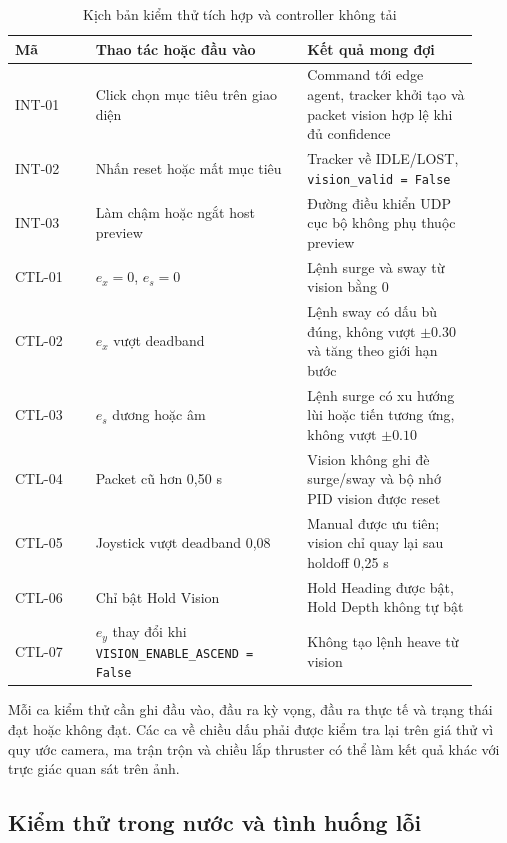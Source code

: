 \documentclass[../DoAn.tex]{subfiles}
\begin{document}
\begin{table}[htbp]
    \centering
    \caption{Kịch bản kiểm thử tích hợp và controller không tải}
    \label{tab:kiemthu_controller}
    \renewcommand{\arraystretch}{1.25}
    \begin{tabular}{|p{0.16\linewidth}|p{0.42\linewidth}|p{0.34\linewidth}|}
        \hline
        \textbf{Mã} & \textbf{Thao tác hoặc đầu vào} & \textbf{Kết quả mong đợi} \\
        \hline
        INT-01 & Click chọn mục tiêu trên giao diện & Command tới edge agent, tracker khởi tạo và packet vision hợp lệ khi đủ confidence \\
        \hline
        INT-02 & Nhấn reset hoặc mất mục tiêu & Tracker về IDLE/LOST, \texttt{vision\_valid = False} \\
        \hline
        INT-03 & Làm chậm hoặc ngắt host preview & Đường điều khiển UDP cục bộ không phụ thuộc preview \\
        \hline
        CTL-01 & $e_x = 0$, $e_s = 0$ & Lệnh surge và sway từ vision bằng 0 \\
        \hline
        CTL-02 & $e_x$ vượt deadband & Lệnh sway có dấu bù đúng, không vượt $\pm 0.30$ và tăng theo giới hạn bước \\
        \hline
        CTL-03 & $e_s$ dương hoặc âm & Lệnh surge có xu hướng lùi hoặc tiến tương ứng, không vượt $\pm 0.10$ \\
        \hline
        CTL-04 & Packet cũ hơn 0,50 s & Vision không ghi đè surge/sway và bộ nhớ PID vision được reset \\
        \hline
        CTL-05 & Joystick vượt deadband 0,08 & Manual được ưu tiên; vision chỉ quay lại sau holdoff 0,25 s \\
        \hline
        CTL-06 & Chỉ bật Hold Vision & Hold Heading được bật, Hold Depth không tự bật \\
        \hline
        CTL-07 & $e_y$ thay đổi khi \texttt{VISION\_ENABLE\_ASCEND = False} & Không tạo lệnh heave từ vision \\
        \hline
    \end{tabular}
\end{table}

Mỗi ca kiểm thử cần ghi đầu vào, đầu ra kỳ vọng, đầu ra thực tế và trạng thái đạt hoặc không đạt. Các ca về chiều dấu phải được kiểm tra lại trên giá thử vì quy ước camera, ma trận trộn và chiều lắp thruster có thể làm kết quả khác với trực giác quan sát trên ảnh.

\subsection{Kiểm thử trong nước và tình huống lỗi}
\end{document}
